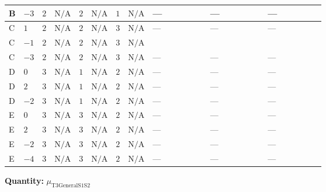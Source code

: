 \documentclass[8pt]{article}
\begin{document}
\begin{landscape}
\begin{longtable}{@{}llcccccc >{\raggedright\arraybackslash}p{0.21\linewidth} >{\raggedright\arraybackslash}p{0.21\linewidth} >{\raggedright\arraybackslash}p{0.21\linewidth}@{}}
\midrule
B & $-3$ & $2$ & $\text{N/A}$ & $2$ & $\text{N/A}$ & $1$ & $\text{N/A}$ & --- & --- & --- \\
\midrule
C & $1$ & $2$ & $\text{N/A}$ & $2$ & $\text{N/A}$ & $3$ & $\text{N/A}$ & --- & --- & --- \\
\midrule
C & $-1$ & $2$ & $\text{N/A}$ & $2$ & $\text{N/A}$ & $3$ & $\text{N/A}$ & \scriptsize\adjustbox{max width=\linewidth}{$\begin{gathered} 12 {\lambda_{9}} \left({\mu_{\mathrm{T3GeneralS1S2}}}\right)^{*}\end{gathered}$} & \scriptsize\adjustbox{max width=\linewidth}{$\begin{gathered} -\frac{9 {g_2}^2 {\mu_{\mathrm{T3GeneralS1S2}}}}{2}\end{gathered}$} & \scriptsize\adjustbox{max width=\linewidth}{$\begin{gathered} -\frac{3 {g_1}^2 {\mu_{\mathrm{T3GeneralS1S2}}}}{2}\end{gathered}$} \\
\midrule
C & $-3$ & $2$ & $\text{N/A}$ & $2$ & $\text{N/A}$ & $3$ & $\text{N/A}$ & --- & --- & --- \\
\midrule
D & $0$ & $3$ & $\text{N/A}$ & $1$ & $\text{N/A}$ & $2$ & $\text{N/A}$ & --- & --- & --- \\
\midrule
D & $2$ & $3$ & $\text{N/A}$ & $1$ & $\text{N/A}$ & $2$ & $\text{N/A}$ & --- & --- & --- \\
\midrule
D & $-2$ & $3$ & $\text{N/A}$ & $1$ & $\text{N/A}$ & $2$ & $\text{N/A}$ & --- & --- & --- \\
\midrule
E & $0$ & $3$ & $\text{N/A}$ & $3$ & $\text{N/A}$ & $2$ & $\text{N/A}$ & --- & --- & --- \\
\midrule
E & $2$ & $3$ & $\text{N/A}$ & $3$ & $\text{N/A}$ & $2$ & $\text{N/A}$ & --- & --- & --- \\
\midrule
E & $-2$ & $3$ & $\text{N/A}$ & $3$ & $\text{N/A}$ & $2$ & $\text{N/A}$ & --- & --- & --- \\
\midrule
E & $-4$ & $3$ & $\text{N/A}$ & $3$ & $\text{N/A}$ & $2$ & $\text{N/A}$ & --- & --- & --- \\
\midrule
\bottomrule
\end{longtable}
\clearpage
\noindent\textbf{Quantity: }${\mu_{\mathrm{T3GeneralS1S2}}}$\par\smallskip

\end{landscape}
\end{document}

